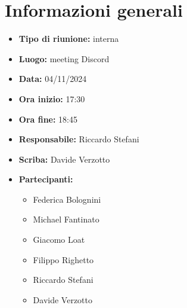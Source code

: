 


\section{Informazioni generali}

\begin{itemize}
    \item \textbf{Tipo di riunione:} interna
    \item \textbf{Luogo:} meeting Discord
    \item \textbf{Data:} 04/11/2024
    \item \textbf{Ora inizio:} 17:30
    \item \textbf{Ora fine:} 18:45
    \item \textbf{Responsabile:} Riccardo Stefani
    \item \textbf{Scriba:} Davide Verzotto
    \item \textbf{Partecipanti:}
    \begin{itemize}
        \item Federica Bolognini
        \item Michael Fantinato
        \item Giacomo Loat
        \item Filippo Righetto
        \item Riccardo Stefani
        \item Davide Verzotto
    \end{itemize}
\end{itemize}
